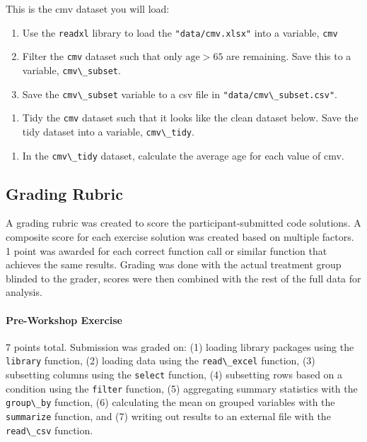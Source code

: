 \documentclass[acmsmall]{acmart}
\newcommand{\code}[1]{\lstinline{#1}}
\begin{document}
\begin{displayquote}
	
	This is the cmv dataset you will load:
	
	\begin{enumerate}
		\item Use the \code{readxl} library to load the \code{"data/cmv.xlsx"} into a variable, \code{cmv}
		\item Filter the \code{cmv} dataset such that only $\text{age} > 65$ are remaining.
		Save this to a variable, \code{cmv\_subset}.
		\item Save the \code{cmv\_subset} variable to a csv file in \code{"data/cmv\_subset.csv"}.
	\end{enumerate}
	
	\begin{enumerate}
		\item Tidy the \code{cmv} dataset such that it looks like the clean dataset below.
		Save the tidy dataset into a variable, \code{cmv\_tidy}.
	\end{enumerate}
	
	\begin{enumerate}
		\item In the \code{cmv\_tidy} dataset, calculate the average age for each value of cmv.
	\end{enumerate}
	
\end{displayquote}

\subsection{Grading Rubric}

A grading rubric was created to score the participant-submitted code solutions.
A composite score for each exercise solution was created based on multiple factors.
1 point was awarded for each correct function call or similar function that achieves the same results.
Grading was done with the actual treatment group blinded to the grader,
scores were then combined with the rest of the full data for analysis.

\paragraph{Pre-Workshop Exercise}

7 points total.
Submission was graded on:
(1) loading library packages using the \code{library} function,
(2) loading data using the \code{read\_excel} function,
(3) subsetting columns using the \code{select} function,
(4) subsetting rows based on a condition using the \code{filter} function,
(5) aggregating summary statistics with the \code{group\_by} function,
(6) calculating the mean on grouped variables with the \code{summarize} function, and
(7) writing out results to an external file with the \code{read\_csv} function.
\end{document}
